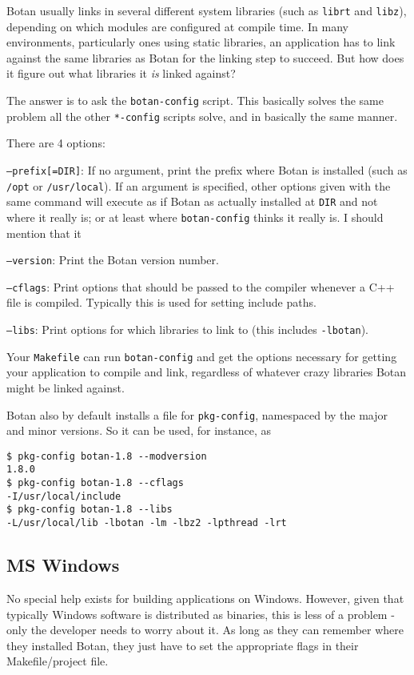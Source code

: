 \documentclass{article}
\newcommand{\filename}[1]{\texttt{#1}}
\begin{document}
Botan usually links in several different system libraries (such as
\texttt{librt} and \texttt{libz}), depending on which modules are
configured at compile time. In many environments, particularly ones
using static libraries, an application has to link against the same
libraries as Botan for the linking step to succeed. But how does it
figure out what libraries it \emph{is} linked against?

The answer is to ask the \filename{botan-config} script. This
basically solves the same problem all the other \filename{*-config}
scripts solve, and in basically the same manner.

There are 4 options:

\texttt{--prefix[=DIR]}: If no argument, print the prefix where Botan
is installed (such as \filename{/opt} or \filename{/usr/local}). If an
argument is specified, other options given with the same command will
execute as if Botan as actually installed at \filename{DIR} and not
where it really is; or at least where \filename{botan-config} thinks
it really is. I should mention that it

\texttt{--version}: Print the Botan version number.

\texttt{--cflags}: Print options that should be passed to the compiler
whenever a C++ file is compiled. Typically this is used for setting
include paths.

\texttt{--libs}: Print options for which libraries to link to (this includes
\texttt{-lbotan}).

Your \filename{Makefile} can run \filename{botan-config} and get the
options necessary for getting your application to compile and link,
regardless of whatever crazy libraries Botan might be linked against.

Botan also by default installs a file for \texttt{pkg-config},
namespaced by the major and minor versions. So it can be used,
for instance, as

\begin{verbatim}
$ pkg-config botan-1.8 --modversion
1.8.0
$ pkg-config botan-1.8 --cflags
-I/usr/local/include
$ pkg-config botan-1.8 --libs
-L/usr/local/lib -lbotan -lm -lbz2 -lpthread -lrt
\end{verbatim}

\subsection{MS Windows}

No special help exists for building applications on Windows. However,
given that typically Windows software is distributed as binaries, this
is less of a problem - only the developer needs to worry about it. As
long as they can remember where they installed Botan, they just have
to set the appropriate flags in their Makefile/project file.
\end{document}

